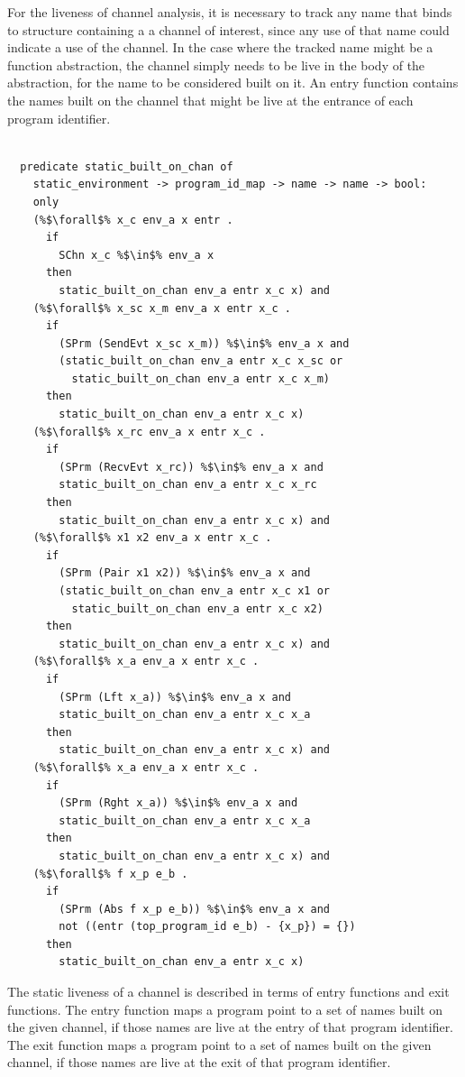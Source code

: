 \documentclass{article}
\begin{document}
For the liveness of channel analysis, it is necessary to track any name that binds to structure
containing a a channel of interest, since any use of that name could indicate a use of the
channel. In the case where the tracked name might be a function abstraction, the channel simply
needs to be live in the body of the abstraction, for the name to be considered built on it.
An entry function contains the names built on the channel that might be live at the entrance
of each program identifier.

\begin{lstlisting}[language=logic, escapechar=\%]

  predicate static_built_on_chan of
    static_environment -> program_id_map -> name -> name -> bool:
    only
    (%$\forall$% x_c env_a x entr .
      if 
        SChn x_c %$\in$% env_a x 
      then 
        static_built_on_chan env_a entr x_c x) and
    (%$\forall$% x_sc x_m env_a x entr x_c . 
      if
        (SPrm (SendEvt x_sc x_m)) %$\in$% env_a x and
        (static_built_on_chan env_a entr x_c x_sc or
          static_built_on_chan env_a entr x_c x_m)
      then 
        static_built_on_chan env_a entr x_c x)
    (%$\forall$% x_rc env_a x entr x_c . 
      if  
        (SPrm (RecvEvt x_rc)) %$\in$% env_a x and
        static_built_on_chan env_a entr x_c x_rc
      then 
        static_built_on_chan env_a entr x_c x) and
    (%$\forall$% x1 x2 env_a x entr x_c . 
      if  
        (SPrm (Pair x1 x2)) %$\in$% env_a x and
        (static_built_on_chan env_a entr x_c x1 or
          static_built_on_chan env_a entr x_c x2)
      then 
        static_built_on_chan env_a entr x_c x) and
    (%$\forall$% x_a env_a x entr x_c .
      if
        (SPrm (Lft x_a)) %$\in$% env_a x and
        static_built_on_chan env_a entr x_c x_a
      then 
        static_built_on_chan env_a entr x_c x) and
    (%$\forall$% x_a env_a x entr x_c .
      if
        (SPrm (Rght x_a)) %$\in$% env_a x and
        static_built_on_chan env_a entr x_c x_a
      then 
        static_built_on_chan env_a entr x_c x) and
    (%$\forall$% f x_p e_b .
      if
        (SPrm (Abs f x_p e_b)) %$\in$% env_a x and
        not ((entr (top_program_id e_b) - {x_p}) = {})
      then
        static_built_on_chan env_a entr x_c x)
  \end{lstlisting}


The static liveness of a channel is described in terms of entry functions and
exit functions. The entry function maps a program point to a set of names built on
the given channel, if those names are live at the entry of that program identifier.
The exit function maps a program point to a
set of names built on the given channel, if those names are live at the exit of that
program identifier.
\end{document}
